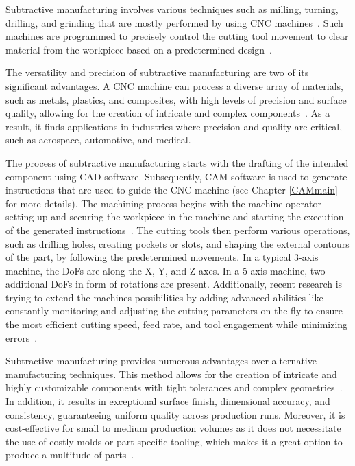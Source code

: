 Subtractive manufacturing involves various techniques such as milling, turning, drilling, and grinding that are mostly performed by using \acrshort{CNC} machines~\cite{Kumar.2020}. Such machines are programmed to precisely control the cutting tool movement to clear material from the workpiece based on a predetermined design~\cite{Amanullah.2017}.

The versatility and precision of subtractive manufacturing are two of its significant advantages. A \acrshort{CNC} machine can process a diverse array of materials, such as metals, plastics, and composites, with high levels of precision and surface quality, allowing for the creation of intricate and complex components~\cite{Tomaz.2021,Yang.2019}. As a result, it finds applications in industries where precision and quality are critical, such as aerospace, automotive, and medical.

The process of subtractive manufacturing starts with the drafting of the intended component using \acrshort{CAD} software. Subsequently, \acrshort{CAM} software is used to generate instructions that are used to guide the \acrshort{CNC} machine (see Chapter \ref{CAMmain} for more details). The machining process begins with the machine operator setting up and securing the workpiece in the machine and starting the execution of the generated instructions~\cite{Nee.2015}. The cutting tools then perform various operations, such as drilling holes, creating pockets or slots, and shaping the external contours of the part, by following the predetermined movements. In a typical 3-axis machine, the \acrshort{DoF}s are along the X, Y, and Z axes. In a 5-axis machine, two additional \acrshort{DoF}s in form of rotations are present. Additionally, recent research is trying to extend the machines possibilities by adding advanced abilities like constantly monitoring and adjusting the cutting parameters on the fly to ensure the most efficient cutting speed, feed rate, and tool engagement while minimizing errors~\cite{Tien.2021}.


Subtractive manufacturing provides numerous advantages over alternative manufacturing techniques. This method allows for the creation of intricate and highly customizable components with tight tolerances and complex geometries~\cite{Jayawardane.2023}. In addition, it results in exceptional surface finish, dimensional accuracy, and consistency, guaranteeing uniform quality across production runs. Moreover, it is cost-effective for small to medium production volumes as it does not necessitate the use of costly molds or part-specific tooling, which makes it a great option to produce a multitude of parts~\cite{Gu.2018}.

